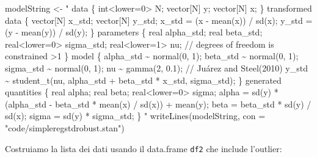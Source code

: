 \documentclass[
  11pt,
]{krantz}
\makeatletter
\newenvironment{Shaded}{\begin{snugshade}}{\end{snugshade}}
\newcommand{\AttributeTok}[1]{\textcolor[rgb]{0.61,0.61,0.61}{#1}}
\newcommand{\FunctionTok}[1]{\textcolor[rgb]{0,0,0}{#1}}
\newcommand{\NormalTok}[1]{#1}
\newcommand{\OtherTok}[1]{\textcolor[rgb]{0.37,0.37,0.37}{#1}}
\newcommand{\SpecialCharTok}[1]{\textcolor[rgb]{0,0,0}{#1}}
\newcommand{\StringTok}[1]{\textcolor[rgb]{0.5,0.5,0.5}{#1}}
\newenvironment{kframe}{%
\medskip{}
\setlength{\fboxsep}{.8em}
 \def\at@end@of@kframe{}%
 \ifinner\ifhmode%
  \def\at@end@of@kframe{\end{minipage}}%
  \begin{minipage}{\columnwidth}%
 \fi\fi%
 \def\FrameCommand##1{\hskip\@totalleftmargin \hskip-\fboxsep
 \colorbox{shadecolor}{##1}\hskip-\fboxsep
     \hskip-\linewidth \hskip-\@totalleftmargin \hskip\columnwidth}%
 \MakeFramed {\advance\hsize-\width
   \@totalleftmargin\z@ \linewidth\hsize
   \@setminipage}}%
 {\par\unskip\endMakeFramed%
 \at@end@of@kframe}
\renewenvironment{Shaded}{\begin{kframe}}{\end{kframe}}
\theoremstyle{definition}
\theoremstyle{definition}
\theoremstyle{definition}
\theoremstyle{definition}
\theoremstyle{remark}
\makeatother
\begin{document}
\begin{Shaded}
\begin{Highlighting}[]
\NormalTok{modelString }\OtherTok{\textless{}{-}} \StringTok{"}
\StringTok{data \{}
\StringTok{  int\textless{}lower=0\textgreater{} N;}
\StringTok{  vector[N] y;}
\StringTok{  vector[N] x;}
\StringTok{\}}
\StringTok{transformed data \{}
\StringTok{  vector[N] x\_std;}
\StringTok{  vector[N] y\_std;}
\StringTok{  x\_std = (x {-} mean(x)) / sd(x);}
\StringTok{  y\_std = (y {-} mean(y)) / sd(y);}
\StringTok{\}}
\StringTok{parameters \{}
\StringTok{  real alpha\_std;}
\StringTok{  real beta\_std;}
\StringTok{  real\textless{}lower=0\textgreater{} sigma\_std;}
\StringTok{  real\textless{}lower=1\textgreater{} nu;    // degrees of freedom is constrained \textgreater{}1}
\StringTok{\}}
\StringTok{model \{}
\StringTok{  alpha\_std \textasciitilde{} normal(0, 1);}
\StringTok{  beta\_std \textasciitilde{} normal(0, 1);}
\StringTok{  sigma\_std \textasciitilde{} normal(0, 1);}
\StringTok{  nu \textasciitilde{} gamma(2, 0.1);   // Juárez and Steel(2010)}
\StringTok{  y\_std \textasciitilde{} student\_t(nu, alpha\_std + beta\_std * x\_std, sigma\_std);}
\StringTok{\}}
\StringTok{generated quantities \{}
\StringTok{  real alpha;}
\StringTok{  real beta;}
\StringTok{  real\textless{}lower=0\textgreater{} sigma;}
\StringTok{  alpha = sd(y) * (alpha\_std {-} beta\_std * mean(x) / sd(x))}
\StringTok{           + mean(y);}
\StringTok{  beta = beta\_std * sd(y) / sd(x);}
\StringTok{  sigma = sd(y) * sigma\_std;}
\StringTok{\}}
\StringTok{"}
\FunctionTok{writeLines}\NormalTok{(modelString, }\AttributeTok{con =} \StringTok{"code/simpleregstdrobust.stan"}\NormalTok{)}
\end{Highlighting}
\end{Shaded}

Costruiamo la lista dei dati usando il data.frame \texttt{df2} che include l'outlier:

\begin{Shaded}
\end{Shaded}
\end{document}
